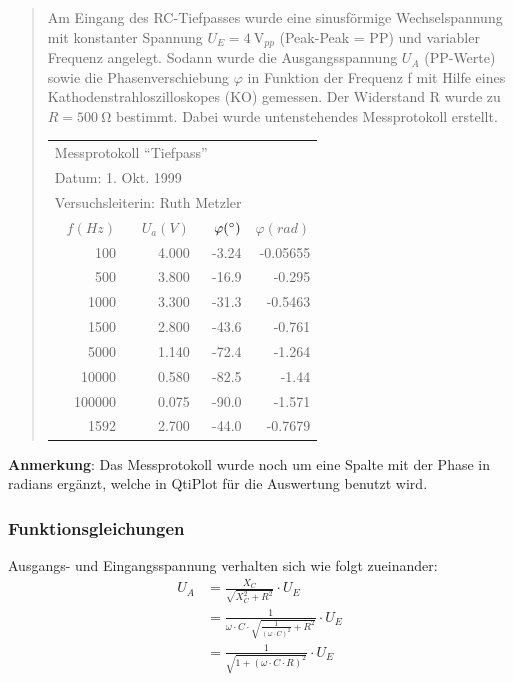 \begin{quote}
Am  Eingang des  RC-Tiefpasses wurde  eine sinusf\"ormige  Wechselspannung mit
konstanter Spannung $U_E = \SI{4}{\volt}_{pp}$  (Peak-Peak = PP) und variabler
Frequenz angelegt. Sodann  wurde die  Ausgangsspannung $U_A$  (PP-Werte) sowie
die Phasenverschiebung  $\varphi$ in Funktion  der Frequenz f mit  Hilfe eines
Kathodenstrahloszilloskopes  (KO) gemessen. Der  Widerstand  R wurde  zu $R  =
\SI{500}{\ohm}$ bestimmt. Dabei wurde untenstehendes Messprotokoll erstellt.
\\
\begin{center}
        \begin{tabular}{rrrr}
            \toprule
            \multicolumn{3}{l}{Messprotokoll ``Tiefpass''} \\
            \multicolumn{3}{l}{Datum: 1. Okt. 1999} \\
            \multicolumn{3}{l}{Versuchsleiterin: Ruth Metzler} \\
            \midrule
            $f(Hz)$  &  $U_a (V)$    &  $\varphi (\degree)$ & $\varphi (rad)$ \\
            \midrule
            100      & 4.000        & -3.24 &  -0.05655 \\
            500      & 3.800        & -16.9 &  -0.295   \\
            1000     & 3.300        & -31.3 &  -0.5463  \\
            1500     & 2.800        & -43.6 &  -0.761   \\
            5000     & 1.140        & -72.4 &  -1.264   \\
            10000    & 0.580        & -82.5 &  -1.44    \\
            100000   & 0.075        & -90.0 &  -1.571   \\
            1592     & 2.700        & -44.0 &  -0.7679  \\
            \bottomrule
        \end{tabular}
        \label{tab:rc}
\end{center}
\end{quote}

\textbf{Anmerkung}: Das Messprotokoll wurde noch um  eine Spalte mit der Phase
in radians erg\"anzt, welche in QtiPlot f\"ur die Auswertung benutzt wird.


\subsubsection{Funktionsgleichungen}
Ausgangs- und Eingangsspannung verhalten sich wie folgt zueinander:
\begin{align}
    U_A & = \frac{X_C}{\sqrt{X_C^2+R^2}} \cdot U_E \\
                    & = \frac{1}{\omega \cdot C \cdot \sqrt{\frac{1}{(\omega \cdot C)^2} + R^2}} \cdot U_E \\
                    & = \frac{1}{\sqrt{1+(\omega \cdot C \cdot R)^2}} \cdot U_E
    \label{eq:rc:uaue}
\end{align}

